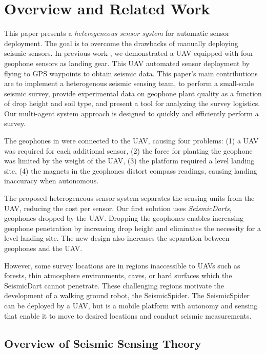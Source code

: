 \section[RelatedWork]{Overview and Related Work}

This paper presents a \emph{heterogeneous sensor system} for automatic sensor deployment. The goal is to overcome the drawbacks of manually deploying seismic sensors. 
In previous work \cite{sudarshan2015using}, we demonstrated a UAV equipped with four geophone sensors as landing gear.
This UAV automated sensor deployment by flying to GPS waypoints to obtain seismic data. 
This paper's main contributions are to implement a heterogenous seismic sensing team, to perform a small-scale seismic survey, provide experimental data on geophone plant quality as a function of drop height and soil type, and present a tool for analyzing the survey logistics.
Our multi-agent system approach is designed to quickly and efficiently perform a survey.

The geophones in  \cite{sudarshan2015using} were connected to the UAV, causing four problems:
(1) a UAV was required for each additional sensor,
(2)  the force for planting the geophone was limited by the weight of the UAV,
(3) the platform required a level landing site,
(4) the magnets in the geophones distort compass readings, causing landing inaccuracy when autonomous.

The proposed heterogeneous sensor system separates the sensing units from the UAV, reducing the cost per sensor. 
Our first solution uses \emph{SeismicDarts}, geophones dropped by the UAV.
Dropping the geophones enables increasing geophone penetration by increasing drop height and eliminates the necessity for a level landing site.
The new design also increases the separation between geophones and the UAV.

However, some survey locations are in regions inaccessible to UAVs such as forests, thin atmosphere environments, caves, or hard surfaces which the SeismicDart cannot penetrate. These challenging regions motivate the development of a walking ground robot, the SeismicSpider. 
 The SeismicSpider can be deployed by a UAV, but is a mobile platform with autonomy and sensing that enable it to move to desired locations and conduct seismic measurements.

\subsection{Overview of Seismic Sensing Theory}

